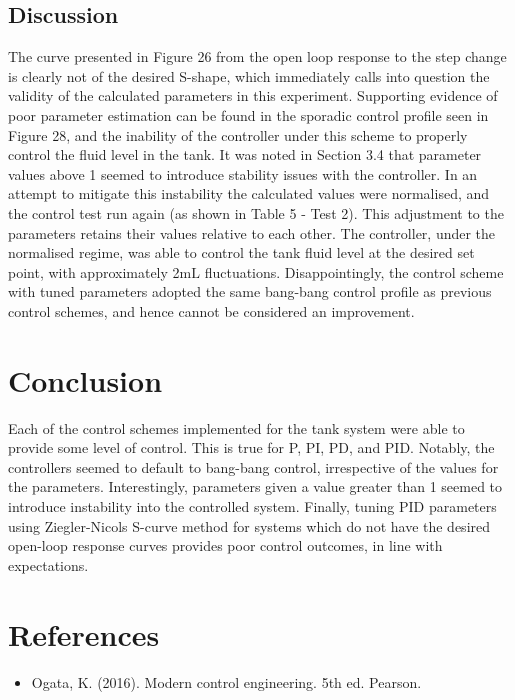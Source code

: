 \documentclass{article}
\begin{document}
\subsection{Discussion}
The curve presented in Figure 26 from the open loop response to the step change is clearly not of the desired S-shape, which immediately calls into question the validity of the calculated parameters in this experiment. Supporting evidence of poor parameter estimation can be found in the sporadic control profile seen in Figure 28, and the inability of the controller under this scheme to properly control the fluid level in the tank. It was noted in Section 3.4 that parameter values above 1 seemed to introduce stability issues with the controller. In an attempt to mitigate this instability the calculated values were normalised, and the control test run again (as shown in Table 5 - Test 2). This adjustment to the parameters retains their values relative to each other. The controller, under the normalised regime, was able to control the tank fluid level at the desired set point, with approximately 2$\si{\milli\liter}$ fluctuations. Disappointingly, the control scheme with tuned parameters adopted the same bang-bang control profile as previous control schemes, and hence cannot be considered an improvement.


\section{Conclusion}
Each of the control schemes implemented for the tank system were able to provide some level of control. This is true for P, PI, PD, and PID. Notably, the controllers seemed to default to bang-bang control, irrespective of the values for the parameters. Interestingly, parameters given a value greater than 1 seemed to introduce instability into the controlled system. Finally, tuning PID parameters using Ziegler-Nicols S-curve method for systems which do not have the desired open-loop response curves provides poor control outcomes, in line with expectations.

\section{References}
\begin{itemize}
	\item Ogata, K. (2016). Modern control engineering. 5th ed. Pearson.
\end{itemize}
\end{document}
